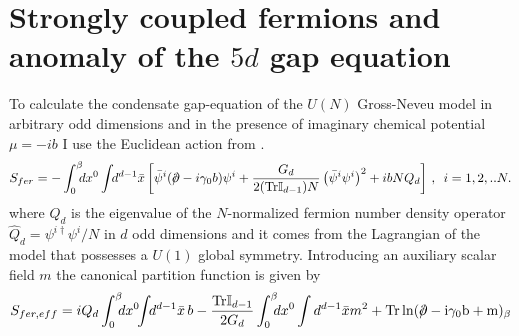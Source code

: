 \documentclass[twoside]{article}
\begin{document}
\section{Strongly coupled fermions and anomaly of the $5d$ gap equation}
 To calculate the condensate gap-equation of the $U(N)$ Gross-Neveu model in arbitrary odd dimensions and in the presence of imaginary chemical potential $\mu=-ib$ I use the Euclidean action from \cite{Filothodoros:2018}.
 \begin{equation}
 	S_{fer} = -\int_0^\beta \!\!\!dx^0\int \!\!d^{d-1}\bar{x} \left[\bar{\psi }^{i}(\slash\!\!\!\partial  -i\gamma_0 b)\psi ^{i}+\frac{G_d}{2({\rm Tr}\mathbb I_{d-1})N}\left (\bar{\psi }^{i}\psi ^{i}\right )^{2} +ib NQ_d\right]\,,\,\,\,i=1,2,..N.
 \end{equation}
where $Q_d$ is the eigenvalue of the $N$-normalized fermion number density operator $\hat{Q}_d=\psi^{i\dagger}\psi^i/N$ in $d$ odd dimensions and it comes from the Lagrangian of the model that possesses a $U(1)$ global symmetry. Introducing an auxiliary scalar field $m$ the canonical partition function is given by
 \begin{equation}
 	S_{fer,eff}=iQ_d\int_0^\beta \!\!\!dx^0\!\!\int\!\!d^{d-1}\bar{x}\,b-\frac{{\rm Tr}\mathbb I_{d-1}}{2G_d}\int_0^\beta \!\!\!dx^0\int d^{d-1}\bar{x} m^2+\rm Tr\ln(\slash\!\!\!\partial-i\gamma_0b+m)_\beta
 \end{equation}
 
\end{document}
